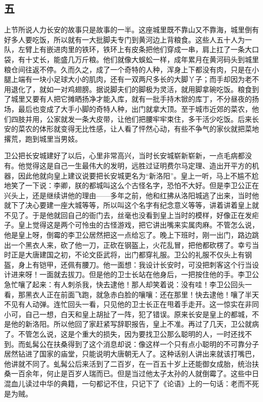 \subsection{五} 

上节所说人力长安的故事只是故事的一半。这座城里既不靠山又不靠海，城里倒有好多人要吃饭，所以就有一大批脚夫专门到黄河边上背粮食。这些人五十人为一队，左臂上有嵌进肉里的铁环，铁环上有皮条把他们穿成一串，肩上扛了一条大口袋，有十丈长，能盛几万斤粮。他们就像大蜈蚣一样，成年累月在黄河码头到城里粮仓间往返不停。久而久之，成了一个奇特的人种，浑身上下都没有肉，只是在小腿上端有一块小足球大小的肌肉，还有一双两尺多长的大脚丫子；而手却因为老不用退化了，就如一对鸡翅膀。据说脚夫们的脚极为灵活，就用脚拿碗吃饭。粮食到了城里又要有人把它摊晒扬净才能入库，就有一批手持木锨的库丁，不分昼夜的扬场，最后也变成了大手小脚的奇特人种，出门就拿大顶。至于城市近郊的菜农，他们四肢并用，公家就发一条大皮带，让他们把腰牢牢束住，多干活少吃饭。后来长安的菜农的体形就变得无比性感，让人看了怦然心动，有些不争气的家伙就把菜地撂荒，跑到城里当男妓。 

卫公把长安城建好了以后，心里非常高兴，当时长安城崭新崭新，一点毛病都没有。他觉得这是自己一生最伟大的发明，远胜过证明费尔马定理、造出开平方的机器，因此他就向皇上建议说要把长安城更名为“新洛阳”。皇上一听，马上不尴不尬地笑了一下说：李卿，朕的都城叫这么个古怪名字，恐怕不大好。但是李卫公正在兴头上，还是继续讲他的理由——多年之前，他和红拂从洛阳城逃了出来，当时他就下了决心要建一座大城等等，所以叫这个名字有纪念意义等等，讲着讲着皇上就不见了。于是他就回自己的衙门去，丝毫也没看到皇上当时的模样，好像正在发疟子。皇上觉得这是两个可怜虫的古怪游戏，把它讲出嘴来实属肉麻。不管怎么说，他是皇上呀，倒霉的李卫公居然把这一点给忘了。晚上下班时，刚一出门，路边跳出一个黑衣人来，砍了他一刀，正砍在钢盔上，火花乱冒，把他都砍楞了。幸亏当时正是大唐建国之初，不论文臣武将，出门都穿礼服。卫公的礼服不仅头上有钢盔，身上有铠甲，还佩有腰刀。他一面想：我设计长安时，可没把刺客这个行当设计进来呀！一面就去拔刀。但是他的卫士长站在他身后，一把按住他的手。李卫公急忙嚷了起来：有人刺杀我，快去逮他！那人却笑着说：没有哇！李卫公回头一看，那黑衣人正在前面飞跑，就急赤白脸的嚷嚷：还在那里！快去逮他！嚷了半天不见有人动弹。连忙回头一看，只见他的卫士长正在甩着手走开。这一惊实在非同小可，自己一想，白天和皇上胡扯了一阵，犯了错误。原来长安是皇上的都城，不是他的新洛阳。所以他回了家赶紧写辞职报告，皇上不准。再过了几天，卫公就病了。不管怎么说，这是个重大的损失，因为要找卫公那么聪明的人，一时还找不到。而虬髯公在扶桑得到了这个消息却说：像这样一个只有点小聪明的不可靠分子居然钻进了国家的庙堂，只能说明大唐朝无人了。这种话别人讲出来就该打嘴巴，他讲就不同了。虬髯公后来活到了二百岁，在一百五十岁上还能御女成胎，统治扶桑一百余年，何止是百岁人瑞而已。但是当过他太子太孙的人就倒霉了。这些中日混血儿读过中华的典籍，一句都记不住，只记下了《论语》上的一句话：老而不死是为贼。 

